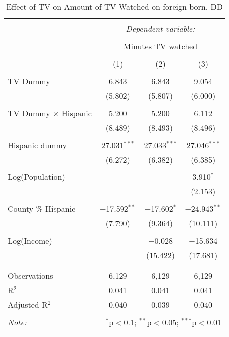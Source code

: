 
\begin{table}[!htbp] \centering 
  \caption{Effect of TV on Amount of TV Watched on foreign-born, DD} 
  \label{} 
\begin{tabular}{@{\extracolsep{-5pt}}lccc} 
\\[-1.8ex]\hline 
\hline \\[-1.8ex] 
 & \multicolumn{3}{c}{\textit{Dependent variable:}} \\ 
\cline{2-4} 
\\[-1.8ex] & \multicolumn{3}{c}{Minutes TV watched} \\ 
\\[-1.8ex] & (1) & (2) & (3)\\ 
\hline \\[-1.8ex] 
 TV Dummy & 6.843 & 6.843 & 9.054 \\ 
  & (5.802) & (5.807) & (6.000) \\ 
  & & & \\ 
 TV Dummy $\times$ Hispanic  & 5.200 & 5.200 & 6.112 \\ 
  & (8.489) & (8.493) & (8.496) \\ 
  & & & \\ 
 Hispanic dummy & 27.031$^{***}$ & 27.033$^{***}$ & 27.046$^{***}$ \\ 
  & (6.272) & (6.382) & (6.385) \\ 
  & & & \\ 
 Log(Population) &  &  & 3.910$^{*}$ \\ 
  &  &  & (2.153) \\ 
  & & & \\ 
 County \% Hispanic & $-$17.592$^{**}$ & $-$17.602$^{*}$ & $-$24.943$^{**}$ \\ 
  & (7.790) & (9.364) & (10.111) \\ 
  & & & \\ 
 Log(Income) &  & $-$0.028 & $-$15.634 \\ 
  &  & (15.422) & (17.681) \\ 
  & & & \\ 
\hline \\[-1.8ex] 
Observations & 6,129 & 6,129 & 6,129 \\ 
R$^{2}$ & 0.041 & 0.041 & 0.041 \\ 
Adjusted R$^{2}$ & 0.040 & 0.039 & 0.040 \\ 
\hline 
\hline \\[-1.8ex] 
\textit{Note:}  & \multicolumn{3}{r}{$^{*}$p$<$0.1; $^{**}$p$<$0.05; $^{***}$p$<$0.01} \\ 
 & \multicolumn{3}{r}{} \\ 
\end{tabular} 
\end{table} 
